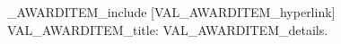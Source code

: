         \ifVAL_AWARDITEM_include
        [VAL_AWARDITEM_hyperlink] VAL_AWARDITEM_title: VAL_AWARDITEM_details.
        \fi

